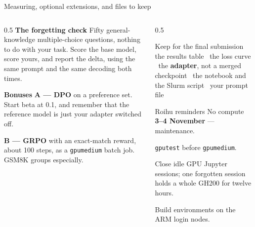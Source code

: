 \documentclass[aspectratio=169,10pt]{beamer}
\begin{document}
\fi
\begin{frame}{Measuring, optional extensions, and files to keep}
  \begin{columns}[T]
    \begin{column}{0.5\textwidth}
      \textbf{The forgetting check}
      \vspace{0.2em}
      \small
      Fifty general-knowledge multiple-choice questions, nothing to do with
      your task. Score the base model, score yours, and report the delta,
      using the same prompt and the same decoding both times.
      \vspace{0.6em}

      \normalsize\textbf{Bonuses}
      \vspace{0.2em}
      \small
      \textbf{A --- DPO} on a preference set. Start beta at 0.1, and remember
      that the reference model is just your adapter switched off.
      \vspace{0.2em}

      \textbf{B --- GRPO} with an exact-match reward, about 100 steps, as a
      \texttt{gpumedium} batch job. GSM8K groups especially.
    \end{column}
    \begin{column}{0.5\textwidth}
      \begin{block}{Keep for the final submission}
        \small
        the results table \textbullet\ the loss curve \textbullet\ the
        \textbf{adapter}, not a merged checkpoint \textbullet\ the notebook and
        the Slurm script \textbullet\ your prompt file
      \end{block}
      \vspace{0.2em}
      \begin{block}{Roihu reminders}
        \small
        No compute \textbf{3--4 November} --- maintenance.

        \texttt{gputest} before \texttt{gpumedium}.

        Close idle GPU Jupyter sessions; one forgotten session holds a whole
        GH200 for twelve hours.

        Build environments on the ARM login nodes.
      \end{block}
    \end{column}
  \end{columns}
\end{frame}
\end{document}
